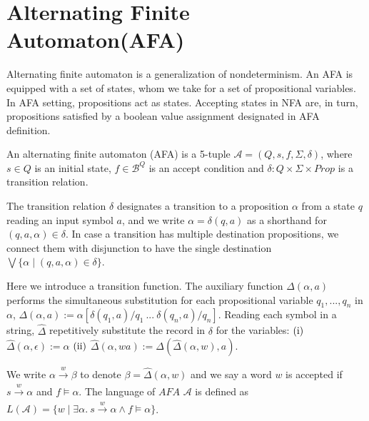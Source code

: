 \section{Alternating Finite Automaton(AFA)}

Alternating finite automaton is a generalization of
nondeterminism\cite{Yu1997}. An AFA is equipped with a set of
states, whom we take for a set of propositional variables. In AFA setting,
propositions act as states. Accepting states in NFA are, in turn, propositions
satisfied by a boolean value assignment designated in AFA definition.

\begin{definition}
An alternating finite automaton (AFA) is a 5-tuple \( \mathcal{A} = (Q, s, f,
\Sigma, \delta) \), where \( s \in Q \) is an initial state, \( f \in
\mathcal{B}^Q \) is an accept condition and \( \delta: Q \times \Sigma \times
\mathit{Prop} \) is a transition relation.
\end{definition}

The transition relation \( \delta \) designates a transition to a proposition \(
\alpha \) from a state \( q \) reading an input symbol \( a \), and we write \(
\alpha = \delta(q, a) \) as a shorthand for \( (q, a, \alpha) \in \delta \). In
case a transition has multiple destination propositions, we connect them with
disjunction to have the single destination \( \bigvee \{ \alpha \mid (q, a,
\alpha) \in \delta \} \).

Here we introduce a transition function. The auxiliary function \(
\Delta(\alpha, a) \) performs the simultaneous substitution for each
propositional variable \( q_1, ..., q_n \) in \( \alpha \), \( \Delta(\alpha, a)
:= \alpha[\delta(q_1, a)/q_1 \ ...\ \delta(q_n, a)/q_n] \). Reading each symbol
in a string, \( \hat{ \Delta } \) repetitively substitute the record in \(
\delta \) for the variables: \( (\rm i) \) \( \hat{\Delta}(\alpha, \epsilon) :=
\alpha \) \( (\rm ii) \) \( \hat{\Delta}(\alpha, wa) :=
\Delta(\hat{\Delta}(\alpha, w), a) \).

We write \( \alpha \xrightarrow[]w \beta \) to denote \( \beta =
\hat{\Delta}(\alpha, w) \) and we say a word \( w \) is accepted if \( s
\xrightarrow[]w \alpha \) and \( f \models \alpha \).  The language of \(
\mathit{AFA} \) \( \mathcal{A} \) is defined as \( L(\mathcal{A}) = \{ w \mid
\exists \alpha .\ s \xrightarrow[]w \alpha \wedge f \models \alpha \} \).

